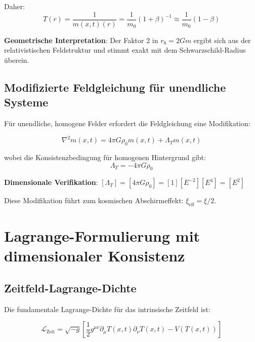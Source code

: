 \documentclass[12pt,a4paper]{article}
\newcommand{\Tfield}{T(x,t)}
\newcommand{\mfield}{m(x,t)}
\theoremstyle{definition}
\theoremstyle{remark}
\begin{document}
	Daher:
	\begin{equation}
		T(r) = \frac{1}{\mfield(r)} = \frac{1}{m_0}(1 + \beta)^{-1} \approx \frac{1}{m_0}(1 - \beta)
		\label{eq:zeitfeld_loesung}
	\end{equation}
	
	\textbf{Geometrische Interpretation}: Der Faktor 2 in $r_0 = 2Gm$ ergibt sich aus der relativistischen Feldstruktur und stimmt exakt mit dem Schwarzschild-Radius überein.
	
	\subsection{Modifizierte Feldgleichung für unendliche Systeme}
	\label{subsec:unendliche_systeme}
	
	Für unendliche, homogene Felder erfordert die Feldgleichung eine Modifikation:
	
	\begin{equation}
		\nabla^2 \mfield = 4\pi G \rho_0 \mfield + \Lambda_T \mfield
		\label{eq:modifizierte_feldgleichung}
	\end{equation}
	
	wobei die Konsistenzbedingung für homogenen Hintergrund gibt:
	\begin{equation}
		\Lambda_T = -4\pi G \rho_0
		\label{eq:lambda_t_definition}
	\end{equation}
	
	\textbf{Dimensionale Verifikation}: $[\Lambda_T] = [4\pi G \rho_0] = [1][E^{-2}][E^4] = [E^2]$ \checkmark
	
	Diese Modifikation führt zum kosmischen Abschirmeffekt: $\xi_{\text{eff}} = \xi/2$.
	
	\section{Lagrange-Formulierung mit dimensionaler Konsistenz}
	\label{sec:lagrange_formulierung}
	
	\subsection{Zeitfeld-Lagrange-Dichte}
	\label{subsec:zeitfeld_lagrange}
	
	Die fundamentale Lagrange-Dichte für das intrinsische Zeitfeld ist:
	
	\begin{equation}
		\mathcal{L}_{\text{Zeit}} = \sqrt{-g} \left[\frac{1}{2} g^{\mu\nu} \partial_\mu \Tfield \partial_\nu \Tfield - V(\Tfield)\right]
		\label{eq:zeitfeld_lagrange}
	\end{equation}
	
\end{document}
